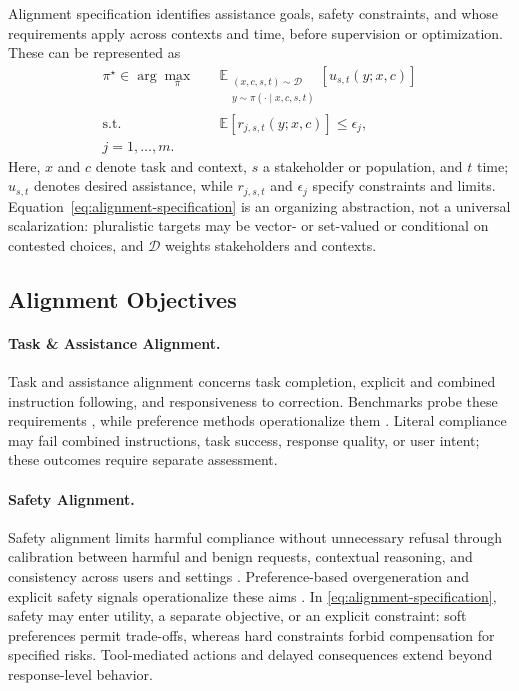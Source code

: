 \documentclass[11pt]{article}
\begin{document}
Alignment specification identifies assistance goals, safety constraints, and whose requirements apply across contexts and time, before supervision or optimization. These can be represented as
\begin{equation}
\begin{aligned}
\pi^{\star} \in \arg\max_{\pi}\quad
&\mathbb{E}_{\substack{(x,c,s,t)\sim\mathcal{D}\\y\sim\pi(\cdot\mid x,c,s,t)}}
\left[u_{s,t}(y;x,c)\right] \\
\text{s.t.}\quad
&\mathbb{E}\left[r_{j,s,t}(y;x,c)\right]\leq\epsilon_j,\\
j=1,\ldots,m .
\end{aligned}
\label{eq:alignment-specification}
\end{equation}
Here, \(x\) and \(c\) denote task and context, \(s\) a stakeholder or population, and \(t\) time; \(u_{s,t}\) denotes desired assistance, while \(r_{j,s,t}\) and \(\epsilon_j\) specify constraints and limits. Equation~\ref{eq:alignment-specification} is an organizing abstraction, not a universal scalarization: pluralistic targets may be vector- or set-valued or conditional on contested choices, and \(\mathcal{D}\) weights stakeholders and contexts.

\subsection{Alignment Objectives}
\label{subsec:alignment-objectives}

\paragraph{Task \& Assistance Alignment.}
Task and assistance alignment concerns task completion, explicit and combined instruction following, and responsiveness to correction. Benchmarks probe these requirements \citep{dong2026ifevalpp,purpura2026mosaic,harada2025manyifeval,kwon2026reasonif,li2025fbbench}, while preference methods operationalize them \citep{zhang2025iopo}. Literal compliance may fail combined instructions, task success, response quality, or user intent; these outcomes require separate assessment.

\paragraph{Safety Alignment.}
Safety alignment limits harmful compliance without unnecessary refusal through calibration between harmful and benign requests, contextual reasoning, and consistency across users and settings \citep{zhang2026llmva,jiang2026els,wang2026hiar,brito2026mijabench}. Preference-based overgeneration and explicit safety signals operationalize these aims \citep{karaman2025porover,li2025explicitsafety}. In \cref{eq:alignment-specification}, safety may enter utility, a separate objective, or an explicit constraint: soft preferences permit trade-offs, whereas hard constraints forbid compensation for specified risks. Tool-mediated actions and delayed consequences extend beyond response-level behavior.
\end{document}
